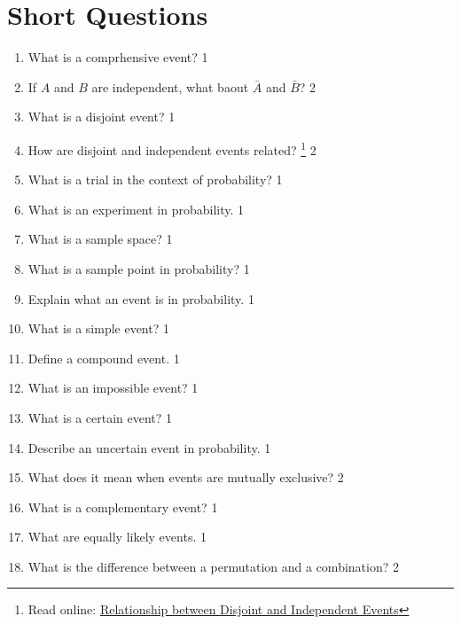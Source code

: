 \documentclass[a4paper,oneside, margin=1.4in]{book}
\begin{document}
\section{Short Questions}
 \begin{enumerate}
 
 \item What is a comprhensive event? \hfill 1
 \item If $A$ and $B$ are independent, what baout $\bar A$ and $\bar B$? \hfill 2
    \item
	What is a disjoint event? \hfill 1
    \item
	How are disjoint and independent events related? \footnote{Read online: \href{https://study.statmania.info/disjint-independent-relation.sm}{Relationship between Disjoint and Independent Events}}  \hfill 2

 
    \item What is a trial in the context of probability? \hfill 1

\item What is an experiment in probability. \hfill 1

\item What is a sample space? \hfill 1

\item What is a sample point in probability? \hfill 1

\item Explain what an event is in probability. \hfill 1

\item What is a simple event? \hfill 1

\item Define a compound event. \hfill 1

\item What is an impossible event? \hfill 1

\item What is a certain event? \hfill 1

\item Describe an uncertain event in probability. \hfill 1

\item What does it mean when events are mutually exclusive? \hfill 2

\item What is a complementary event? \hfill 1

\item What are equally likely events. \hfill 1

\item What is the difference between a permutation and a combination? \hfill 2


\end{enumerate}
\end{document}
